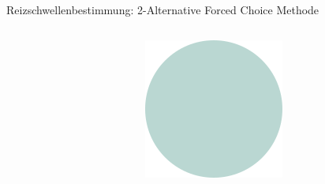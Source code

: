 \documentclass[aspectratio=169]{beamer}
\begin{document}
\begin{frame}{Reizschwellenbestimmung: 2-Alternative Forced Choice Methode}
\begin{columns}[c]
\begin{column}{1cm}
\end{column}
\begin{column}{1cm}
\includegraphics[width=\textwidth]{reizschwelle_seriell_10.png}
\end{column}


\end{columns}
\end{frame}
\end{document}
